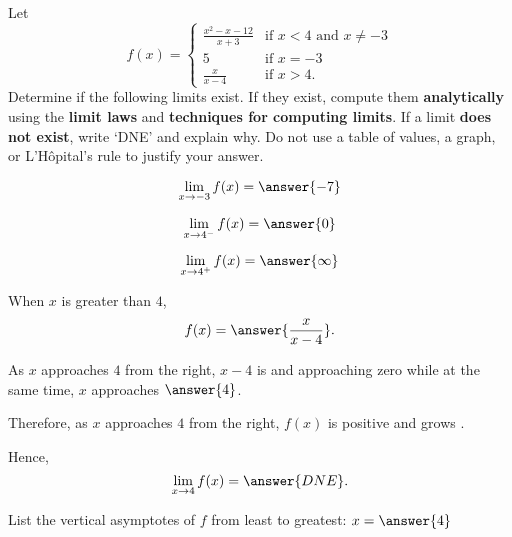 \documentclass{ximera}
\begin{document}

Let 
\[
f(x)=\begin{cases}
\frac{x^2-x-12}{x+3} & \text{if $x<4$ and $x\ne -3$}\\
5 & \text{if $x=-3$}\\
\frac{x}{x-4} & \text{if $x>4$}.
\end{cases}
\]
Determine if the following limits exist. If they exist, compute them \textbf{analytically} using the \textbf{limit laws} and \textbf{techniques for computing limits}. If a limit \textbf{does not exist}, write `DNE' and explain why.  Do not use a table of values, a graph, or L'H\^opital's rule to justify your answer.
\begin{exercise}
  \[
  \lim_{x\to -3}f(x)=\answer{-7}
  \]
\end{exercise}
\begin{exercise}
  \[
  \lim_{x\to 4^{-}}f(x)=\answer{0}
  \]
\end{exercise}
\begin{exercise}
  \[
  \lim_{x\to 4^+}f(x)=\answer{\infty}
  \]
  \begin{exercise}
    When $x$ is greater than $4$,
    \[
    f(x) = \answer{\frac{x}{x-4}}.
    \]
    \begin{exercise}As $x$ approaches $4$ from the right, $x-4$ is  and approaching zero while at the same time, $x$ approaches $\answer{4}$. \begin{exercise} Therefore, as $x$ approaches $4$ from the right, $f(x)$ is positive and grows . \begin{exercise} Hence, 
    \[
    \lim_{x\to 4}f(x)=\answer{DNE}.
    \]
    \end{exercise}
    \end{exercise}
    \end{exercise}
    \end{exercise}
    \end{exercise}
    
\begin{exercise}
List the vertical asymptotes of $f$ from least to greatest: $x=\answer{4}$
\end{exercise}
\end{document}
